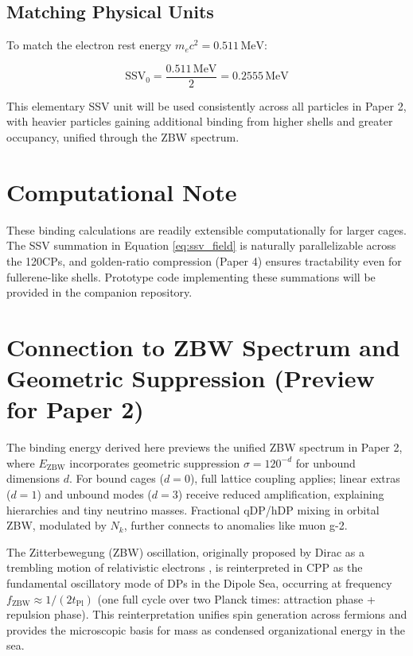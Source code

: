 \documentclass[11pt]{article}
\begin{document}
\subsection{Matching Physical Units}
To match the electron rest energy $m_e c^2 = 0.511 \, \text{MeV}$:

\begin{equation}
\text{SSV}_0 = \frac{0.511 \, \text{MeV}}{2} = 0.2555 \, \text{MeV}
\label{eq:ssv0_value}
\end{equation}

This elementary SSV unit will be used consistently across all particles in Paper 2, with heavier particles gaining additional binding from higher shells and greater occupancy, unified through the ZBW spectrum.

\section{Computational Note}

These binding calculations are readily extensible computationally for larger cages. The SSV summation in Equation \eqref{eq:ssv_field} is naturally parallelizable across the 120CPs, and golden-ratio compression (Paper 4) ensures tractability even for fullerene-like shells. Prototype code implementing these summations will be provided in the companion repository.

\section{Connection to ZBW Spectrum and Geometric Suppression (Preview for Paper 2)}

The binding energy derived here previews the unified ZBW spectrum in Paper 2, where $E_{\text{ZBW}}$ incorporates geometric suppression $\sigma = 120^{-d}$ for unbound dimensions $d$. For bound cages ($d=0$), full lattice coupling applies; linear extras ($d=1$) and unbound modes ($d=3$) receive reduced amplification, explaining hierarchies and tiny neutrino masses. Fractional qDP/hDP mixing in orbital ZBW, modulated by $N_k$, further connects to anomalies like muon g-2.

The Zitterbewegung (ZBW) oscillation, originally proposed by Dirac as a trembling motion of relativistic electrons \cite{dirac1928}, is reinterpreted in CPP as the fundamental oscillatory mode of DPs in the Dipole Sea, occurring at frequency $f_{\text{ZBW}} \approx 1/(2 t_{\text{Pl}})$ (one full cycle over two Planck times: attraction phase + repulsion phase). This reinterpretation unifies spin generation across fermions and provides the microscopic basis for mass as condensed organizational energy in the sea.
\end{document}
